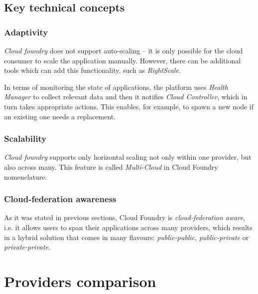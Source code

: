 \subsection{Key technical concepts}

\subsubsection{Adaptivity}
\emph{Cloud foundry} does not support auto-scaling -- it is only possible for the cloud consumer to scale the application manually. However, there can be additional tools which can add this functionality, such as \emph{RightScale}.

In terms of monitoring the state of applications, the platform uses \emph{Health Manager} to collect relevant data and then it notifies \emph{Cloud Controller}, which in turn takes appropriate actions. This enables, for example, to spawn a new node if an existing one needs a replacement.

\subsubsection{Scalability}
\emph{Cloud foundry} supports only horizontal scaling not only within one provider, but also across many. This feature is called \emph{Multi-Cloud} in Cloud Foundry nomenclature.

\subsubsection{Cloud-federation awareness}
As it was stated in previous sections, Cloud Foundry is \emph{cloud-federation aware}, i.e. it allows users to span their applications across many providers, which results in a hybrid solution that comes in many flavours: \emph{public-public}, \emph{public-private} or \emph{private-private}.


\section{Providers comparison}
	
